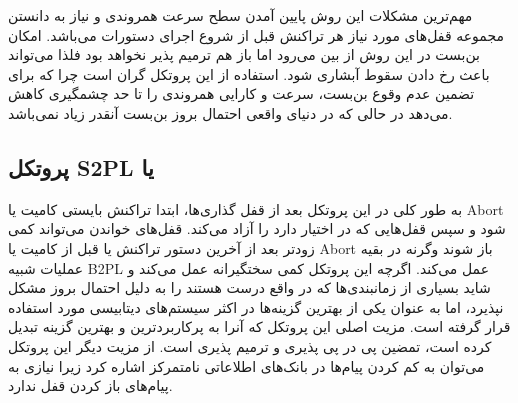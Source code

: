 \documentclass[a4paper]{article}
\begin{document}
\begin{LTR}
    \begin{table}[h]
        \begin{RTL}
            \caption{زمانبندی $S_{7}$}
        \end{RTL}
        \centering
    \end{table}
\end{LTR}

مهم‌ترین مشکلات این روش پایین آمدن سطح سرعت همروندی و نیاز به دانستن مجموعه
قفل‌های مورد نیاز هر تراکنش قبل از شروع اجرای دستورات می‌باشد. امکان بن‌بست در
این روش از بین می‌رود اما باز هم ترمیم پذیر نخواهد بود فلذا می‌تواند باعث رخ
دادن سقوط آبشاری شود. استفاده از این پروتکل گران است چرا که برای تضمین عدم وقوع
بن‌بست، سرعت و کارایی همروندی را تا حد چشمگیری کاهش می‌دهد در حالی که در دنیای
واقعی احتمال بروز بن‌بست آنقدر زیاد نمی‌باشد.

\subsection{پروتکل S2PL یا }

به طور کلی در این پروتکل بعد از قفل گذاری‌ها، ابتدا تراکنش بایستی کامیت یا Abort
شود و سپس قفل‌هایی که در اختیار دارد را آزاد می‌کند. قفل‌های خواندن می‌تواند کمی
زودتر بعد از آخرین دستور تراکنش یا قبل از کامیت یا Abort باز شوند وگرنه در بقیه
عملیات شبیه B2PL عمل می‌کند. اگرچه این پروتکل کمی سختگیرانه عمل می‌کند و شاید
بسیاری از زمانبندی‌ها که در واقع درست هستند را به دلیل احتمال بروز مشکل نپذیرد،
اما به عنوان یکی از بهترین گزینه‌ها در اکثر سیستم‌های دیتابیسی مورد استفاده قرار
گرفته است. مزیت اصلی این پروتکل که آنرا به پرکاربردترین و بهترین گزینه تبدیل
کرده است، تمضین پی در پی پذیری و ترمیم پذیری است. از مزیت دیگر این پروتکل
می‌توان به کم کردن پیام‌ها در بانک‌های اطلاعاتی نامتمرکز اشاره کرد زیرا نیازی به
پیام‌های باز کردن قفل ندارد.
\end{document}
